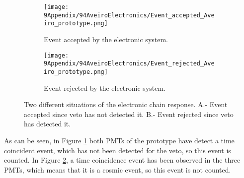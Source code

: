 \begin{enumerate}
\begin{figure}
\centering
    \begin{subfigure}[b]{0.42\textwidth}
    \centering
    \texttt{[image: 9Appendix/94AveiroElectronics/Event\_accepted\_Aveiro\_prototype.png]}  
    \caption{Event accepted by the electronic system.\label{subfig:TrueTritiumEvent}}
    \end{subfigure}
    \hfill
    \begin{subfigure}[b]{0.42\textwidth}
    \centering
    \texttt{[image: 9Appendix/94AveiroElectronics/Event\_rejected\_Aveiro\_prototype.png]}  
    \caption{Event rejected by the electronic system.\label{subfig:FalseTritiumEvent}}
    \end{subfigure}
 \caption{Two different situations of the electronic chain response. A.- Event accepted since veto has not detected it. B.- Event rejected since veto has detected it.}
 \label{fig:ScreenshotElectronic}
\end{figure}


As can be seen, in Figure \ref{subfig:TrueTritiumEvent} both PMTs of the prototype have detect a time coincident event, which has not been detected for the veto, so this event is counted. In Figure \ref{subfig:FalseTritiumEvent}, a time coincidence event has been observed in the three PMTs, which means that it is a cosmic event, so this event is not counted.
\end{enumerate}